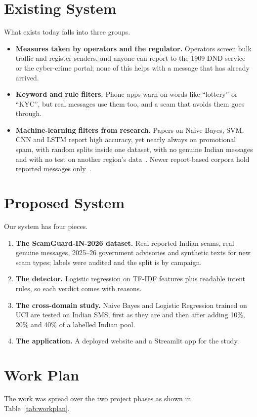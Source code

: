 \section{Existing System}
What exists today falls into three groups.
\begin{itemize}
\item \textbf{Measures taken by operators and the regulator.} Operators screen bulk traffic and register senders, and anyone can report to the 1909 DND service or the cyber-crime portal; none of this helps with a message that has already arrived.
\item \textbf{Keyword and rule filters.} Phone apps warn on words like ``lottery'' or ``KYC'', but real messages use them too, and a scam that avoids them goes through.
\item \textbf{Machine-learning filters from research.} Papers on Naive Bayes, SVM, CNN and LSTM report high accuracy, yet nearly always on promotional spam, with random splits inside one dataset, with no genuine Indian messages and with no test on another region's data~\cite{almeida2013towards,roy2020deep,goel2024ml}. Newer report-based corpora hold reported messages only~\cite{timko2024smishing,agarwal2025fishing}.
\end{itemize}

\section{Proposed System}
Our system has four pieces.
\begin{enumerate}
\item \textbf{The ScamGuard-IN-2026 dataset.} Real reported Indian scams, real genuine messages, 2025--26 government advisories and synthetic texts for new scam types; labels were audited and the split is by campaign.
\item \textbf{The detector.} Logistic regression on TF-IDF features plus readable intent rules, so each verdict comes with reasons.
\item \textbf{The cross-domain study.} Naive Bayes and Logistic Regression trained on UCI are tested on Indian SMS, first as they are and then after adding 10\%, 20\% and 40\% of a labelled Indian pool.
\item \textbf{The application.} A deployed website and a Streamlit app for the study.
\end{enumerate}

\section{Work Plan}
The work was spread over the two project phases as shown in Table~\ref{tab:workplan}.

